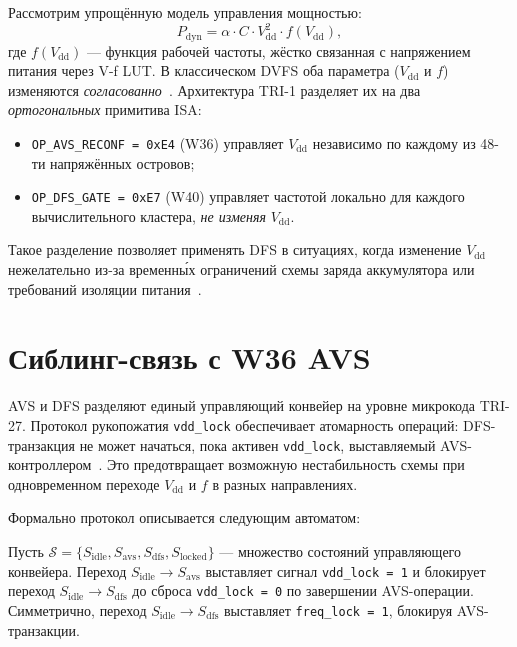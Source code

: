 Рассмотрим упрощённую модель управления мощностью:
\begin{equation}
  P_{\mathrm{dyn}} = \alpha \cdot C \cdot V_{\mathrm{dd}}^{2} \cdot f(V_{\mathrm{dd}}),
  \label{eq:power-full}
\end{equation}
где $f(V_{\mathrm{dd}})$ — функция рабочей частоты, жёстко связанная
с напряжением питания через V-f LUT.  В классическом DVFS оба параметра
($V_{\mathrm{dd}}$ и $f$) изменяются \emph{согласованно}~\cite{Rabaey-DIC2}.
Архитектура TRI-1 разделяет их на два \emph{ортогональных} примитива ISA:
\begin{itemize}
  \item \texttt{OP\_AVS\_RECONF = 0xE4} (W36) управляет $V_{\mathrm{dd}}$
        независимо по каждому из 48-ти напряжённых островов;
  \item \texttt{OP\_DFS\_GATE = 0xE7} (W40) управляет частотой локально
        для каждого вычислительного кластера, \emph{не изменяя} $V_{\mathrm{dd}}$.
\end{itemize}

Такое разделение позволяет применять DFS в ситуациях, когда изменение
$V_{\mathrm{dd}}$ нежелательно из-за временн\'{ы}х ограничений схемы заряда
аккумулятора или требований изоляции питания~\cite{Hennessy-Patterson-CA6}.

\section{Сиблинг-связь с W36 AVS}
\label{sec:glava86-avs-sibling}


AVS и DFS разделяют единый управляющий конвейер на уровне микрокода TRI-27.
Протокол рукопожатия \texttt{vdd\_lock} обеспечивает атомарность операций:
DFS-транзакция не может начаться, пока активен \texttt{vdd\_lock},
выставляемый AVS-контроллером~\cite{trinity-fpga134}.  Это предотвращает
возможную нестабильность схемы при одновременном переходе $V_{\mathrm{dd}}$
и $f$ в разных направлениях.

Формально протокол описывается следующим автоматом:

\begin{definition}
\label{def:vdd-lock-automaton}
Пусть $\mathcal{S} = \{S_{\mathrm{idle}}, S_{\mathrm{avs}}, S_{\mathrm{dfs}},
S_{\mathrm{locked}}\}$ — множество состояний управляющего конвейера.
Переход $S_{\mathrm{idle}} \to S_{\mathrm{avs}}$ выставляет сигнал
\texttt{vdd\_lock = 1} и блокирует переход $S_{\mathrm{idle}} \to S_{\mathrm{dfs}}$
до сброса \texttt{vdd\_lock = 0} по завершении AVS-операции.
Симметрично, переход $S_{\mathrm{idle}} \to S_{\mathrm{dfs}}$ выставляет
\texttt{freq\_lock = 1}, блокируя AVS-транзакции.
\end{definition}

